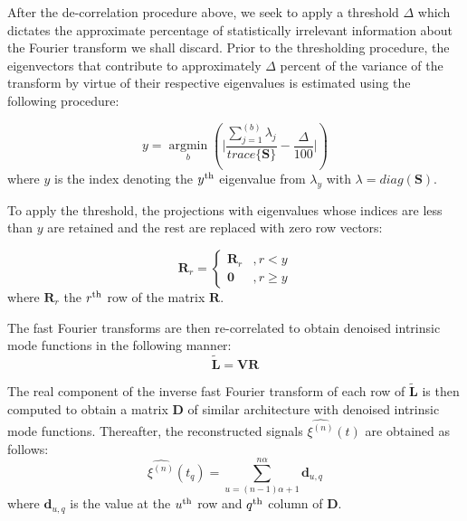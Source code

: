 \documentclass[onecolumn, groupedaddress, 10pt]{revtex4-1}
\begin{document}
After the de-correlation procedure above, we seek to apply a threshold $\Delta$ which dictates the approximate percentage of statistically irrelevant information about the Fourier transform we shall discard. Prior to the thresholding procedure, the eigenvectors that contribute to approximately $\Delta$ percent of the variance of the transform by virtue of their respective eigenvalues is estimated using the following procedure:

\begin{equation}
y = \underset{b}{\operatorname{argmin}} \left( \Bigg| \frac{\sum_{j=1}^{(b)} \lambda_j}{trace \{ \mathbf{S} \}} - \frac{\Delta}{100} \Bigg| \right)
\end{equation}
where $y$ is the index denoting the $y^\textnormal{th}$ eigenvalue from $\lambda_y$ with $\lambda = diag{(\mathbf{S})}$.

To apply the threshold, the projections with eigenvalues whose indices are less than $y$ are retained and the rest are replaced with zero row vectors:

\begin{displaymath}
   \mathbf{R}_r = \left\{
     \begin{array}{lr}
        \mathbf{R}_r & , r < y     \\
       \mathbf{0} & , r \geq y
     \end{array}
   \right.
\end{displaymath}
where $\mathbf{R}_r$ the $r^{\textnormal{th}}$ row of the matrix $\mathbf{R}$.

The fast Fourier transforms are then re-correlated to obtain denoised intrinsic mode functions in the following manner:
\begin{equation}
\tilde{ \mathbf{L} } = \mathbf{V}\mathbf{R}
\end{equation}

The real component of the inverse fast Fourier transform of each row of $\mathbf{\tilde{L}}$ is then computed to obtain a matrix $\mathbf{D}$ of similar architecture with denoised intrinsic mode functions. Thereafter, the reconstructed signals $\hat{\xi^{(n)}}(t)$ are obtained as follows:
\begin{equation}
\hat{\xi^{(n)}}(t_{q}) = \sum_{u = (n-1)\alpha + 1}^{n\alpha} \mathbf{d}_{u,q}
\end{equation}
where $\mathbf{d}_{u,q}$ is the value at the $u^\textnormal{th}$ row and $q^\textnormal{th}$ column of $\textbf{D}$.
\end{document}
